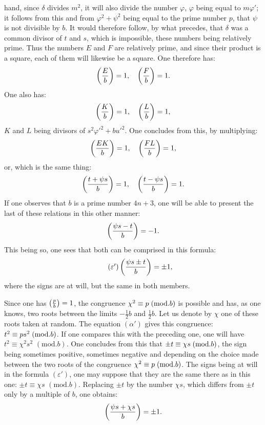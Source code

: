\noindent
hand, since $\delta$ divides $m^2$, it will also divide the number $\varphi$, $\varphi$ being equal to $m\varphi'$;
it follows from this and from $\varphi^2+\psi^2$ being equal to the prime number $p$, that $\psi$ is not
divisible by $b$. It would therefore follow, by what precedes, that $\delta$ was a common divisor
of $t$ and $s$, which is impossible, these numbers being relatively
prime. Thus the numbers $E$ and $F$ are relatively prime, and since their product
is a square, each of them will likewise be a square. One therefore has:
\[
\left(\frac{E}{b}\right)=1,\quad\left(\frac{F}{b}\right)=1.
\]
One also has:
\[
\left(\frac{K}{b}\right)=1,\quad\left(\frac{L}{b}\right)=1,
\]
$K$ and $L$ being divisors of $s^2\varphi'^2+bu'^2$. One concludes from this, by multiplying:
\[
\left(\frac{EK}{b}\right)=1,\quad\left(\frac{FL}{b}\right)=1,
\]
or, which is the same thing:
\[
\left(\frac{t+\psi s}{b}\right)=1,\quad\left(\frac{t-\psi s}{b}\right)=1.
\]
If one observes that $b$ is a prime number $4n+3$, one will be able to present
the last of these relations in this other manner:
\[
\left(\frac{\psi s-t}{b}\right)=-1.
\]
This being so, one sees that both can be comprised in this formula:
\begin{equation*}\tag{$\varepsilon'$}
\left(\frac{\psi s\pm t}{b}\right)=\pm1,
\end{equation*}
where the signs are at will, but the same in both members.
\par\indent
Since one has $\left(\frac{p}{b}\right)=1$, the congruence $\chi^2\equiv p\;(\mathrm{mod}.b)$ is possible and
has, as one knows, two roots between the limits $-\frac12b$ and $\frac12b$. Let us denote by
$\chi$ one of these roots taken at random. The equation $(\alpha')$ gives this congruence:
$t^2\equiv ps^2\;(\mathrm{mod}.b)$. If one compares this with the preceding one, one will have $t^2\equiv\chi^2s^2$
$(\mathrm{mod}.b)$. One concludes from this that $\pm t\equiv\chi s\;(\mathrm{mod}.b)$, the sign being sometimes positive,
sometimes negative and depending on the choice made between the two roots
of the congruence $\chi^2\equiv p\;(\mathrm{mod}.b)$. The signs being at will in the formula
$(\varepsilon')$, one may suppose that they are the same there as in this one: $\pm t\equiv\chi s$
$(\mathrm{mod}.b)$. Replacing $\pm t$ by the number $\chi s$, which differs from $\pm t$ only by a
multiple of $b$, one obtains:
\[
\left(\frac{\psi s+\chi s}{b}\right)=\pm1.
\]
